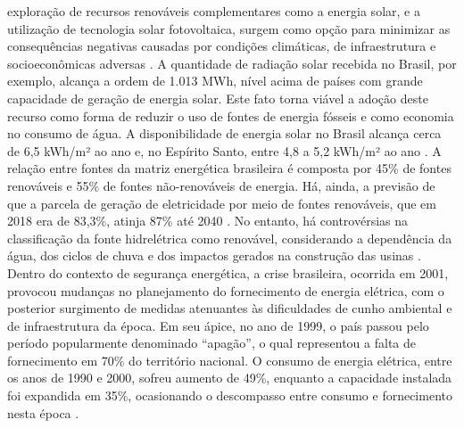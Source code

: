 \begin{onehalfspace}
     exploração  de  recursos  renováveis  complementares  como  a energia solar, e a utilização 
     de tecnologia solar fotovoltaica, surgem como opção para minimizar as    consequências    
     negativas    causadas    por    condições    climáticas,    de    infraestrutura    
     e socioeconômicas adversas \cite{Pikas2014,Pikas2017}.\vspace*{0.3cm} \newline
     A quantidade de radiação solar recebida no Brasil, por exemplo, alcança a ordem de 1.013 MWh, 
     nível acima de países com grande capacidade de geração de energia solar. Este fato 
     torna viável a  adoção  deste  recurso  como  forma  de  reduzir  o  uso  de  fontes  
     de  energia  fósseis  e  como economia  no  consumo  de  água.  A  disponibilidade  de  energia
     solar  no  Brasil  alcança  cerca  de 6,5 kWh/m²  ao  ano  e,  no  Espírito  Santo,  
     entre  4,8  a  5,2 kWh/m²  ao  ano \cite{AgenciadeRegulacaodeServicosPublicosdoEspiritoSanto-ARSP2019,
     Didone2014,InternationalEnergyAgency-IEA2018}.\vspace*{0.3cm} \newline 
     A relação entre fontes da matriz energética brasileira é composta por 45\% de fontes renováveis
     e 55\% de fontes não-renováveis de energia. Há, ainda, a previsão de que a parcela de geração
     de eletricidade  por  meio  de  fontes  renováveis,  que  em  2018  era  de  83,3\%,  atinja  
     87\%  até  2040 \cite{EmpresadePesquisaEnergetica-EPE2017}. No entanto, há controvérsias na 
     classificação da fonte hidrelétrica como renovável, considerando a dependência da água, 
     dos ciclos de chuva e dos impactos gerados na construção das usinas \cite{Leme2012}.\vspace*{0.3cm} \newline
     Dentro  do  contexto  de  segurança  energética,  a  crise  brasileira,  ocorrida  em  2001,  
     provocou mudanças no planejamento do fornecimento de energia elétrica, com o posterior 
     surgimento de medidas  atenuantes  às dificuldades  de  cunho  ambiental  e  de  infraestrutura  
     da  época.  Em  seu ápice, no ano de 1999, o país passou pelo período popularmente denominado “apagão”, 
     o qual representou  a  falta  de  fornecimento  em  70\%  do  território  nacional.  
     O  consumo  de  energia elétrica, entre os anos de 1990 e 2000, sofreu aumento de 49\%, 
     enquanto a capacidade instalada foi expandida em 35\%, ocasionando o descompasso entre 
     consumo e fornecimento nesta época \cite{Conejero2016,Tolmasquim2000}.\vspace*{0.3cm} \newline 

\end{onehalfspace}
